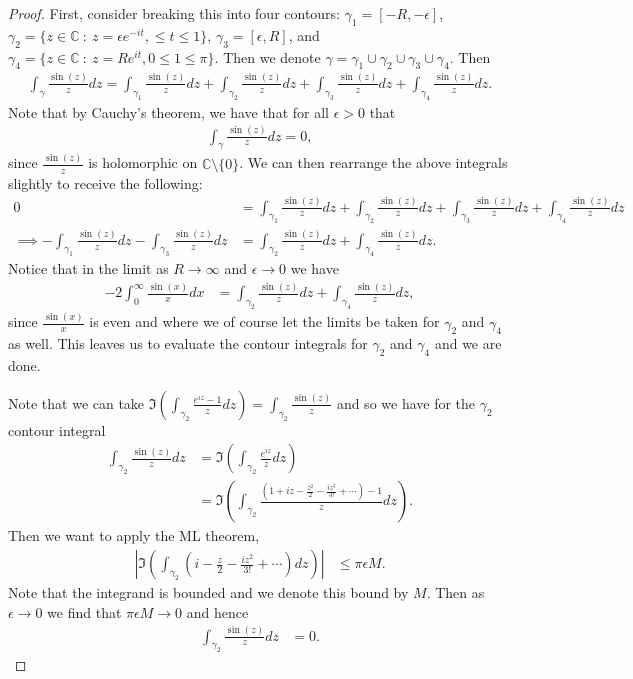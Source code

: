 \documentclass[leqno]{article}
\theoremstyle{nonumberplain}
\newtheorem{proof}{Proof}
\newcommand{\C}{\mathbb{C}}
\begin{document}
\begin{proof}
First, consider breaking this into four contours: $\gamma_1 = [-R,-\epsilon]$, $\gamma_2 = \{z\in \C ~\colon~ z=\epsilon e^{-it} , \leq t \leq 1 \}$, $\gamma_3 = [\epsilon,R]$, and $\gamma_4 = \{z \in \C ~\colon~ z=R e^{i t}, 0\leq 1 \leq \pi\}$.  Then we denote $\gamma = \gamma_1 \cup \gamma_2 \cup \gamma_3 \cup \gamma_4$. Then
\begin{align*}
\int_\gamma \frac{\sin(z)}{z} dz = \int_{\gamma_1} \frac{\sin(z)}{z}dz+\int_{\gamma_2} \frac{\sin(z)}{z}dz+\int_{\gamma_3} \frac{\sin(z)}{z}dz+\int_{\gamma_4} \frac{\sin(z)}{z}dz.
\end{align*}
Note that by Cauchy's theorem, we have that for all $\epsilon>0$ that
\begin{align*}
\int_\gamma \frac{\sin(z)}{z}dz = 0,
\end{align*}
since $\frac{\sin(z)}{z}$ is holomorphic on $\C\setminus \{0\}$.  We can then rearrange the above integrals slightly to receive the following:
\begin{align*}
0&=\int_{\gamma_1} \frac{\sin(z)}{z}dz+\int_{\gamma_2} \frac{\sin(z)}{z}dz+\int_{\gamma_3} \frac{\sin(z)}{z}dz+\int_{\gamma_4} \frac{\sin(z)}{z}dz\\
\implies -\int_{\gamma_1} \frac{\sin(z)}{z}dz-\int_{\gamma_3}\frac{\sin(z)}{z}dz &= \int_{\gamma_2}\frac{\sin(z)}{z}dz + \int_{\gamma_4}\frac{\sin(z)}{z}dz.
\end{align*}
Notice that in the limit as $R\to \infty$ and $\epsilon \to 0$ we have
\begin{align*}
-2\int_0^\infty \frac{\sin(x)}{x}dx &= \int_{\gamma_2}\frac{\sin(z)}{z}dz + \int_{\gamma_4}\frac{\sin(z)}{z}dz,
\end{align*}
since $\frac{\sin(x)}{x}$ is even and where we of course let the limits be taken for $\gamma_2$ and $\gamma_4$ as well. This leaves us to evaluate the contour integrals for $\gamma_2$ and $\gamma_4$ and we are done.  

Note that we can take $\Im \left( \int_{\gamma_2} \frac{e^{iz}-1}{z}dz\right) = \int_{\gamma_2} \frac{\sin(z)}{z}$ and so we have for the $\gamma_2$ contour integral
\begin{align*}
\int_{\gamma_2}\frac{\sin(z)}{z}dz &= \Im\left(\int_{\gamma_2} \frac{e^{iz}}{z}dz\right)\\
&=\Im\left(\int_{\gamma_2} \frac{\left(1+iz-\frac{z^2}{2}-\frac{iz^3}{3!}+\cdots\right)-1}{z}dz\right).
\end{align*}
Then we want to apply the ML theorem,
\begin{align*}
\left|\Im \left( \int_{\gamma_2} \left(i-\frac{z}{2}-\frac{iz^2}{3!}+\cdots \right) dz \right) \right| &\leq \pi \epsilon M.
\end{align*}
Note that the integrand is bounded and we denote this bound by $M$.  Then as $\epsilon \to 0$ we find that $\pi \epsilon M \to 0$ and hence
\begin{align*}
\int_{\gamma_2}\frac{\sin(z)}{z}dz &=0.
\end{align*}


\end{proof}
\end{document}
